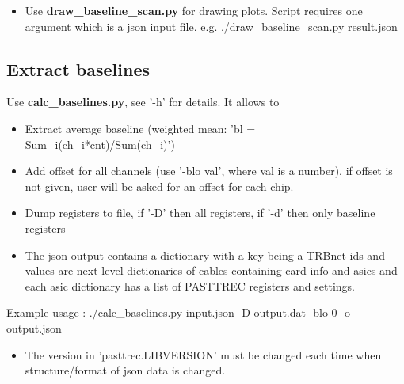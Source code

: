 \documentclass{article}
\begin{document}
\begin{itemize}
  \item Use \textbf{draw\_baseline\_scan.py} for drawing plots. Script requires one argument which is a json input file. e.g. ./draw\_baseline\_scan.py result.json
\end{itemize}

\subsection*{Extract baselines}
Use \textbf{calc\_baselines.py}, see '-h' for details. It allows to
\begin{itemize}
  \item Extract average baseline (weighted mean: 'bl = Sum\_i(ch\_i*cnt)/Sum(ch\_i)')
  \item Add offset for all channels (use '-blo val', where val is a number), if offset is not given, user will be asked for an offset for each chip.
  \item Dump registers to file, if '-D' then all registers, if '-d' then only baseline registers
  \item The json output contains a dictionary with a key being a TRBnet ids and values are next-level dictionaries of cables containing card info and asics and each asic dictionary has a list of PASTTREC registers and settings.
\end{itemize}
Example usage : ./calc\_baselines.py input.json -D output.dat -blo 0 -o output.json

\begin{itemize}
 \item The version in 'pasttrec.LIBVERSION' must be changed each time when structure/format of json data is changed.
\end{itemize}
\end{document}
